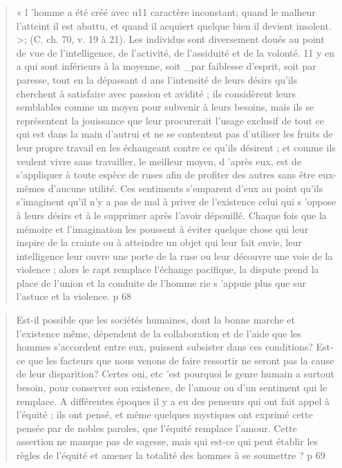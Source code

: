 \begin{quote}
    
    « l 'homme
a été créé avec u11 caractère inconstant; quand le malheur l'atteint
il est abattu, et quand il acquiert quelque bien il devient insolent. >;
(C. ch. 70, v. 19 à 21). Les individus sont diversement doués au point
de vue de l'intelligence, de l'activité, de l'assiduité et de la volonté. 11 y
en a qui sont inférieurs à la moyenne, soit _par faiblesse d'esprit, soit
par paresse, tout en la dépassant d ans l'intensité de leurs désirs qu'ils
cherchent à satisfaire avec passion et avidité ; ils considèrent leurs
semblables comme un moyen pour subvenir à leurs besoins, mais ils
se représentent la jouissance que leur procurerait l'usage exclusif de
tout ce qui est dans la main d'autrui et ne se contentent pas d'utiliser
les fruits de leur propre travail en les échangeant contre ce qu'ils désirent ;
et comme ils veulent vivre sans travailler, le meilleur moyen, d 'après
eux, est de s'appliquer à toute espèce de ruses afin de profiter des autres
sans être eux-mêmes d'aucune utilité. Ces sentiments s'emparent d'eux
au point qu'ils s'imaginent qu'il n'y a pas de mal à priver de l'existence
celui qui s 'oppose à leurs désirs et à le supprimer après l'avoir
dépouillé. Chaque fois que la mémoire et l'imagination les poussent à
éviter quelque chose qui leur inspire de la crainte ou à atteindre un
objet qui leur fait envie, leur intelligence leur ouvre une porte de la
ruse ou leur découvre une voie de la violence ; alors le rapt remplace
l'échange pacifique, la dispute prend la place de l'union et la conduite
de l'homme rie s 'appuie plus que sur l'astuce et la violence.
p 68
\end{quote}

\begin{quote}
   Est-il possible que les sociétés humaines, dont la bonne marche et
l'existence même, dépendent de la collaboration et de l'aide que les
hommes s'accordent entre eux, puissent subsister dans ces conditions?
Est-ce que les facteurs que nous venons de faire ressortir ne seront pas
la cause de leur disparition? Certes oui, etc 'est pourquoi le genre humain
a surtout besoin, pour conserver son existence, de l'amour ou d'un
sentiment qui le remplace.
A différentes époques il y a eu des penseurs qui ont fait appel à
l'équité ; ils ont pensé, et même quelques mystiques ont exprimé cette
pensée par de nobles paroles, que l'équité remplace l'amour. Cette
assertion ne manque pas de sagesse, mais qui est-ce qui peut établir les
règles de l'équité et amener la totalité des hommes à se soumettre ?
p 69
\end{quote}

